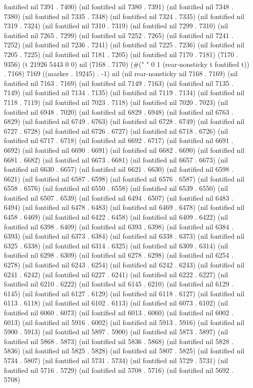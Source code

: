 fontified nil 7391 . 7400) (nil fontified nil 7380 . 7391) (nil fontified nil 7348 . 7380) (nil fontified nil 7335 . 7348) (nil fontified nil 7324 . 7335) (nil fontified nil 7319 . 7324) (nil fontified nil 7310 . 7319) (nil fontified nil 7299 . 7310) (nil fontified nil 7265 . 7299) (nil fontified nil 7252 . 7265) (nil fontified nil 7241 . 7252) (nil fontified nil 7236 . 7241) (nil fontified nil 7225 . 7236) (nil fontified nil 7205 . 7225) (nil fontified nil 7181 . 7205) (nil fontified nil 7170 . 7181) (7170 . 9356) (t 21926 5443 0 0) nil (7168 . 7170) (#(" " 0 1 (rear-nonsticky t fontified t)) . 7168) 7169 ((marker . 19245) . -1) nil (nil rear-nonsticky nil 7168 . 7169) (nil fontified nil 7163 . 7169) (nil fontified nil 7149 . 7163) (nil fontified nil 7135 . 7149) (nil fontified nil 7134 . 7135) (nil fontified nil 7119 . 7134) (nil fontified nil 7118 . 7119) (nil fontified nil 7023 . 7118) (nil fontified nil 7020 . 7023) (nil fontified nil 6948 . 7020) (nil fontified nil 6829 . 6948) (nil fontified nil 6763 . 6829) (nil fontified nil 6749 . 6763) (nil fontified nil 6728 . 6749) (nil fontified nil 6727 . 6728) (nil fontified nil 6726 . 6727) (nil fontified nil 6718 . 6726) (nil fontified nil 6717 . 6718) (nil fontified nil 6692 . 6717) (nil fontified nil 6691 . 6692) (nil fontified nil 6690 . 6691) (nil fontified nil 6682 . 6690) (nil fontified nil 6681 . 6682) (nil fontified nil 6673 . 6681) (nil fontified nil 6657 . 6673) (nil fontified nil 6630 . 6657) (nil fontified nil 6621 . 6630) (nil fontified nil 6598 . 6621) (nil fontified nil 6587 . 6598) (nil fontified nil 6576 . 6587) (nil fontified nil 6558 . 6576) (nil fontified nil 6550 . 6558) (nil fontified nil 6539 . 6550) (nil fontified nil 6507 . 6539) (nil fontified nil 6494 . 6507) (nil fontified nil 6483 . 6494) (nil fontified nil 6478 . 6483) (nil fontified nil 6469 . 6478) (nil fontified nil 6458 . 6469) (nil fontified nil 6422 . 6458) (nil fontified nil 6409 . 6422) (nil fontified nil 6398 . 6409) (nil fontified nil 6393 . 6398) (nil fontified nil 6384 . 6393) (nil fontified nil 6373 . 6384) (nil fontified nil 6338 . 6373) (nil fontified nil 6325 . 6338) (nil fontified nil 6314 . 6325) (nil fontified nil 6309 . 6314) (nil fontified nil 6298 . 6309) (nil fontified nil 6278 . 6298) (nil fontified nil 6254 . 6278) (nil fontified nil 6243 . 6254) (nil fontified nil 6242 . 6243) (nil fontified nil 6241 . 6242) (nil fontified nil 6227 . 6241) (nil fontified nil 6222 . 6227) (nil fontified nil 6210 . 6222) (nil fontified nil 6145 . 6210) (nil fontified nil 6129 . 6145) (nil fontified nil 6127 . 6129) (nil fontified nil 6118 . 6127) (nil fontified nil 6113 . 6118) (nil fontified nil 6102 . 6113) (nil fontified nil 6073 . 6102) (nil fontified nil 6060 . 6073) (nil fontified nil 6013 . 6060) (nil fontified nil 6002 . 6013) (nil fontified nil 5916 . 6002) (nil fontified nil 5913 . 5916) (nil fontified nil 5900 . 5913) (nil fontified nil 5897 . 5900) (nil fontified nil 5873 . 5897) (nil fontified nil 5868 . 5873) (nil fontified nil 5836 . 5868) (nil fontified nil 5828 . 5836) (nil fontified nil 5825 . 5828) (nil fontified nil 5807 . 5825) (nil fontified nil 5734 . 5807) (nil fontified nil 5731 . 5734) (nil fontified nil 5729 . 5731) (nil fontified nil 5716 . 5729) (nil fontified nil 5708 . 5716) (nil fontified nil 5692 . 5708) 